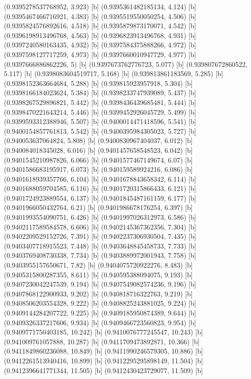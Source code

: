 {{{(0.9395278537768952, 3.923) [b] 
(0.9395361482185134, 4.124) [b] 
(0.9395467466716921, 4.383) [b] 
(0.9395519550050254, 4.506) [b] 
(0.9395824576892616, 4.518) [b] 
(0.9395879873170071, 4.542) [b] 
(0.9396198913496768, 4.563) [b] 
(0.9396823913496768, 4.931) [b] 
(0.9397240580163435, 4.932) [b] 
(0.9397584375888266, 4.972) [b] 
(0.9397598127717259, 4.973) [b] 
(0.9397660010947729, 4.977) [b] 
(0.9397666886862226, 5) [b] 
(0.9397673762776723, 5.077) [b] 
(0.939807672860522, 5.117) [b] 
(0.9398083604519717, 5.168) [b] 
(0.939813861183569, 5.285) [b] 
(0.9398152363664684, 5.288) [b] 
(0.939815923957918, 5.304) [b] 
(0.9398166184023624, 5.384) [b] 
(0.9398233747939089, 5.437) [b] 
(0.9398267529896821, 5.442) [b] 
(0.9398436439685481, 5.444) [b] 
(0.9398470221643214, 5.446) [b] 
(0.9399452926045729, 5.499) [b] 
(0.9399593312388946, 5.507) [b] 
(0.9400014471418596, 5.541) [b] 
(0.9400154857761813, 5.542) [b] 
(0.9400395984305023, 5.727) [b] 
(0.940053637064824, 5.808) [b] 
(0.9400830967404037, 6.012) [b] 
(0.940084018345028, 6.016) [b] 
(0.9401457658548523, 6.042) [b] 
(0.9401545210987826, 6.066) [b] 
(0.9401577467149674, 6.07) [b] 
(0.9401586683195917, 6.073) [b] 
(0.940159589924216, 6.086) [b] 
(0.9401618939357766, 6.104) [b] 
(0.9401678843658342, 6.114) [b] 
(0.9401688059704585, 6.116) [b] 
(0.9401720315866433, 6.121) [b] 
(0.9401724923889554, 6.137) [b] 
(0.9401845487161159, 6.177) [b] 
(0.9401966050432764, 6.21) [b] 
(0.9401986678176254, 6.397) [b] 
(0.9401993554090751, 6.426) [b] 
(0.9401997026312973, 6.586) [b] 
(0.9402117589584578, 6.606) [b] 
(0.9402145367362356, 7.304) [b] 
(0.9402209529152726, 7.391) [b] 
(0.9402237306930504, 7.435) [b] 
(0.9403407718915523, 7.448) [b] 
(0.9403648845458733, 7.733) [b] 
(0.9403769408730338, 7.734) [b] 
(0.9403889972001943, 7.758) [b] 
(0.9403955157650671, 7.82) [b] 
(0.9404075720922276, 8.483) [b] 
(0.9405315800287355, 8.611) [b] 
(0.940595388094075, 9.193) [b] 
(0.9407230042247539, 9.194) [b] 
(0.9407549082574236, 9.196) [b] 
(0.9407868122900933, 9.202) [b] 
(0.940818716322763, 9.219) [b] 
(0.9408506203554328, 9.222) [b] 
(0.9408825243881025, 9.224) [b] 
(0.9409144284207722, 9.225) [b] 
(0.9409185950874389, 9.644) [b] 
(0.9409326337217606, 9.934) [b] 
(0.9409466723560823, 9.954) [b] 
(0.9409771750403185, 10.242) [b] 
(0.9410076777245547, 10.243) [b] 
(0.941009761057888, 10.287) [b] 
(0.9411709473892871, 10.366) [b] 
(0.9411849860236088, 10.849) [b] 
(0.9411990246579305, 10.886) [b] 
(0.9412261513940416, 10.899) [b] 
(0.9412295295898149, 11.504) [b] 
(0.9412396641771344, 11.505) [b] 
(0.9412430423729077, 11.509) [b] 
}}}
